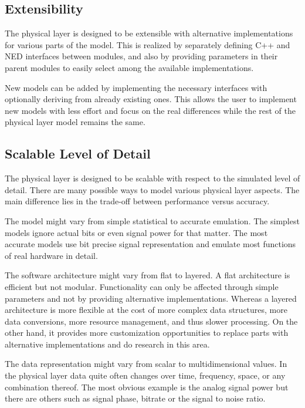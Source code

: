 \subsection{Extensibility}

The physical layer is designed to be extensible with alternative implementations
for various parts of the model. This is realized by separately defining C++ and
NED interfaces between modules, and also by providing parameters in their parent
modules to easily select among the available implementations.

New models can be added by implementing the necessary interfaces with optionally
deriving from already existing ones. This allows the user to implement new models
with less effort and focus on the real differences while the rest of the physical
layer model remains the same.

\subsection{Scalable Level of Detail}

The physical layer is designed to be scalable with respect to the simulated level
of detail. There are many possible ways to model various physical layer aspects.
The main difference lies in the trade-off between performance versus accuracy.

The model might vary from simple statistical to accurate emulation. The simplest
models ignore actual bits or even signal power for that matter. The most accurate
models use bit precise signal representation and emulate most functions of real
hardware in detail.

The software architecture might vary from flat to layered. A flat architecture
is efficient but not modular. Functionality can only be affected through simple
parameters and not by providing alternative implementations. Whereas a layered
architecture is more flexible at the cost of more complex data structures, more
data conversions, more resource management, and thus slower processing. On the
other hand, it provides more customization opportunities to replace parts with
alternative implementations and do research in this area.

The data representation might vary from scalar to multidimensional values. In
the physical layer data quite often changes over time, frequency, space, or any
combination thereof. The most obvious example is the analog signal power but 
there are others such as signal phase, bitrate or the signal to noise ratio.

